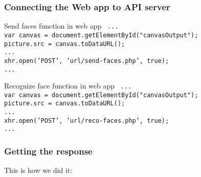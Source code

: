 \begin{frame} \frametitle{Connecting the Web app to API server}
	
	\vfill
	\begin{block} {Send faces function in web app}
		\texttt{
			...\\
	  		var canvas = document.getElementById("canvasOutput");\\
    	  		picture.src = canvas.toDataURL();\\
			...\\
	  		xhr.open('POST', 'url/send-faces.php', true);\\
			...
		}
	\end{block}
	\vfill
	\begin{block} {Recognize face function in web app}
		\texttt{
			...\\
			var canvas = document.getElementById("canvasOutput");\\
		    picture.src = canvas.toDataURL();\\
		    ...\\
		    xhr.open('POST', 'url/reco-faces.php', true);\\
		    ...		
		}
	\end{block}
	\vfill
\end{frame}

\begin{frame} \frametitle{Getting the response}

	This is how we did it:

\end{frame}